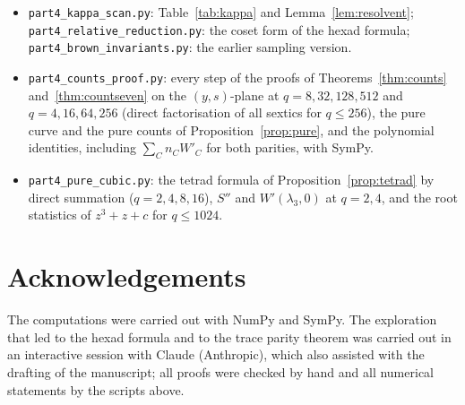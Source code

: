 \documentclass[12pt,a4paper]{amsart}
\theoremstyle{definition}
\newcommand{\Spp}{S''}
\begin{document}
\begin{itemize}[leftmargin=2em]
\item \texttt{part4\_kappa\_scan.py}: Table~\ref{tab:kappa} and Lemma~\ref{lem:resolvent}; \texttt{part4\_relative\_reduction.py}: the coset form of the hexad formula; \texttt{part4\_brown\_invariants.py}: the earlier sampling version.
\item \texttt{part4\_counts\_proof.py}: every step of the proofs of Theorems~\ref{thm:counts} and~\ref{thm:countseven} on the $(y,s)$-plane at $q=8,32,128,512$ and $q=4,16,64,256$ (direct factorisation of all sextics for $q\le256$), the pure curve and the pure counts of Proposition~\ref{prop:pure}, and the polynomial identities, including $\sum_Cn_CW'_C$ for both parities, with SymPy.
\item \texttt{part4\_pure\_cubic.py}: the tetrad formula of Proposition~\ref{prop:tetrad} by direct summation ($q=2,4,8,16$), $\Spp$ and $W'(\lambda_3,0)$ at $q=2,4$, and the root statistics of $z^3+z+c$ for $q\le1024$.
\end{itemize}

\section*{Acknowledgements}
The computations were carried out with NumPy and SymPy. The exploration that led to the hexad formula and to the trace parity theorem was carried out in an interactive session with Claude (Anthropic), which also assisted with the drafting of the manuscript; all proofs were checked by hand and all numerical statements by the scripts above.
\end{document}
